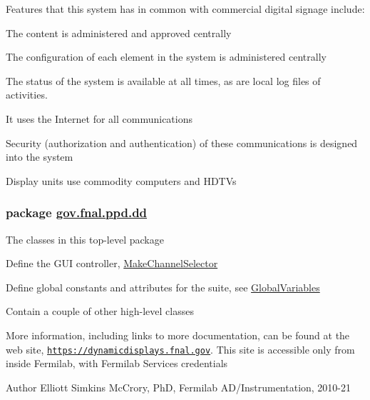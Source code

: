 Features that this system has in common with commercial digital signage include\-: 
\begin{DoxyEnumerate}
\item The content is administered and approved centrally 
\item The configuration of each element in the system is administered centrally 
\item The status of the system is available at all times, as are local log files of activities. 
\item It uses the Internet for all communications 
\item Security (authorization and authentication) of these communications is designed into the system 
\item Display units use commodity computers and H\-D\-T\-Vs 
\end{DoxyEnumerate}

\subsubsection*{package \hyperlink{namespacegov_1_1fnal_1_1ppd_1_1dd}{gov.\-fnal.\-ppd.\-dd}}

The classes in this top-\/level package 
\begin{DoxyItemize}
\item Define the G\-U\-I controller, \hyperlink{classgov_1_1fnal_1_1ppd_1_1dd_1_1MakeChannelSelector}{Make\-Channel\-Selector} 
\item Define global constants and attributes for the suite, see \hyperlink{classgov_1_1fnal_1_1ppd_1_1dd_1_1GlobalVariables}{Global\-Variables} 
\item Contain a couple of other high-\/level classes 
\end{DoxyItemize}

More information, including links to more documentation, can be found at the web site, \href{https://dynamicdisplays.fnal.gov}{\tt https\-://dynamicdisplays.\-fnal.\-gov}. This site is accessible only from inside Fermilab, with Fermilab Services credentials 

\begin{DoxyAuthor}{Author}
Elliott Simkins Mc\-Crory, Ph\-D, Fermilab A\-D/\-Instrumentation, 2010-\/21 
\end{DoxyAuthor}
